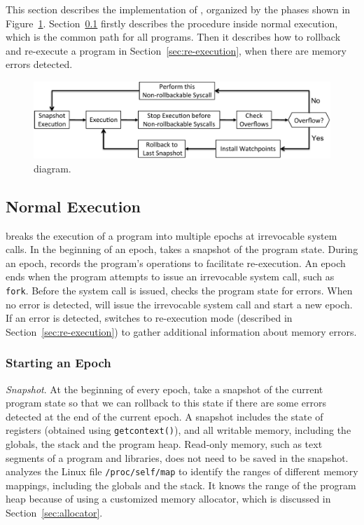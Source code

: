 \label{sec:implementation}

This section describes the implementation of \doubletake{}, organized by the phases
shown in Figure~\ref{fig:phases}. 
Section~\ref{sec:normal_execution} firstly describes the procedure inside normal execution, which
is the common path for all programs.
Then it describes how to rollback and re-execute a program in Section~\ref{sec:re-execution}, when
there are memory errors detected.

\begin{figure}[t] {
	\centering
	\includegraphics[width=6.5in]{figure/stopgapoverview}
	\caption{\DoubleTake{} diagram. \label{fig:phases}}
	}
\end{figure}

\subsection{Normal Execution}
\label{sec:normal_execution}

\doubletake{} breaks the execution of a program into multiple epochs at irrevocable system calls.
In the beginning of an epoch, \doubletake{} takes a snapshot of the program state. 
During an epoch, \doubletake{} records the program's operations to facilitate re-execution. 
An epoch ends when the program attempts to issue an irrevocable system call, such as \texttt{fork}. 
Before the system call is issued, \doubletake{} checks the program state for errors. 
When no error is detected, \doubletake{} will issue the irrevocable system call and start a new epoch.
If an error is detected, \doubletake{} switches to re-execution mode 
(described in Section~\ref{sec:re-execution}) to gather additional information about memory errors. 

\subsubsection{Starting an Epoch}
{\em Snapshot}. 
At the beginning of every epoch, \doubletake{} take a snapshot of the current program state 
so that we can rollback to this state if there are some errors detected at the end of the current epoch.
A snapshot includes the state of registers (obtained using \texttt{getcontext()}),
and all writable memory, including the globals, the stack and the program heap. 
Read-only memory, such as text segments of a program and libraries, does not need to 
be saved in the snapshot. \doubletake{} analyzes the Linux file \texttt{/proc/self/map} 
to identify the ranges of different memory mappings, including the globals and the stack.
It knows the range of the program heap because of using a customized memory allocator, which is discussed in
Section~\ref{sec:allocator}.  

